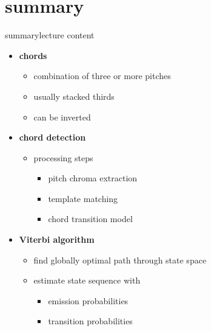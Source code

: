     \section{summary}
        \begin{frame}{summary}{lecture content}
            \begin{itemize}
                \item   \textbf{chords}
                    \begin{itemize}
                        \item   combination of three or more pitches
                        \item   usually stacked thirds
                        \item   can be inverted
                    \end{itemize}
                \smallskip
                \item   \textbf{chord detection}
                    \begin{itemize}
                        \item   processing steps
                            \begin{itemize}
                                \item   pitch chroma extraction
                                \item   template matching
                                \item   chord transition model
                            \end{itemize}
                    \end{itemize}
                \smallskip
                \item   \textbf{Viterbi algorithm}
                    \begin{itemize}
                        \item   find globally optimal path through state space
                        \item   estimate state sequence with
                            \begin{itemize}
                                \item   emission probabilities 
                                \item   transition probabilities
                            \end{itemize}
                    \end{itemize}
            \end{itemize}
        \end{frame}

